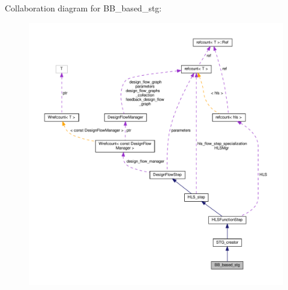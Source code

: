 Collaboration diagram for B\+B\+\_\+based\+\_\+stg\+:
\nopagebreak
\begin{figure}[H]
\begin{center}
\leavevmode
\includegraphics[width=350pt]{df/da5/classBB__based__stg__coll__graph}
\end{center}
\end{figure}

